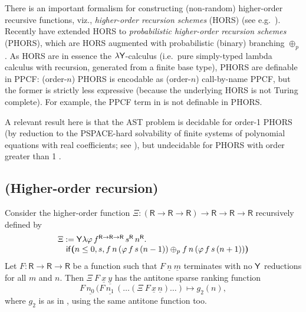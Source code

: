 There is an important formalism for constructing (non-random) higher-order recursive functions, viz., \emph{higher-order recursion schemes} (HORS) (see e.g.~\cite{DBLP:conf/lics/Ong06,DBLP:conf/lics/Ong15}).
Recently \cite{DBLP:conf/lics/KobayashiLG19} have extended HORS to \emph{probabilistic higher-order recursion schemes} (PHORS), which are HORS augmented with probabilistic (binary) branching $\oplus_p$.
As HORS are in essence the $\lambda \mathsf{Y}$-calculus \cite{DBLP:conf/lics/Statman02} (i.e.~pure simply-typed lambda calculus with recursion, generated from a finite base type), PHORS are definable in PPCF:
(order-$n$) PHORS is encodable as (order-$n$) call-by-name PPCF, but the former is strictly less expressive (because the underlying HORS is not Turing complete). 
For example, the PPCF term in  is not definable in PHORS.

A relevant result here is that the AST problem is decidable for order-1 PHORS (by reduction to the PSPACE-hard solvability of finite systems of polynomial equations with real coefficients; see \cite{DBLP:journals/jacm/EtessamiY09}), but undecidable for PHORS with order greater than 1 \cite{DBLP:conf/lics/KobayashiLG19}.

\subsection*{ (Higher-order recursion)}
Consider the higher-order function
$\Xi : (\textsf{R} \to \textsf{R} \to \textsf{R}) \to \textsf{R} \to \textsf{R} \to \textsf{R}$
recursively defined by
\[
\begin{array}{l}
\Xi := \mathsf{Y} \lambda \varphi \, f^{\textsf{R} \to \textsf{R} \to \textsf{R}} \, s^\textsf{R} \, n^\textsf{R} . \\
\quad\mathsf{if}\boldsymbol{(}n \leq 0, s, 
f \, n \, (\varphi \, f \, s \, (n - 1))
\oplus_p
f \, n \, (\varphi \, f \, s \, (n + 1))
\boldsymbol{)}
\end{array}
\]
Let $F : \textsf{R} \to \textsf{R} \to \textsf{R}$ be a function such that $F\ \underline n\ \underline m$ terminates with no $\mathsf{Y}$ reductions for all $m$ and $n$. Then $\Xi\ F\ \underline x\ \underline y$ has the antitone sparse ranking function 
\[
F \, \underline{n_0} \, (F \, \underline{n_1} \, (\dots(\Xi\ F\, \underline x\, \underline n)\dots) \mapsto g_2(n),
\] 
where $g_2$ is as in , using the same antitone function too.

